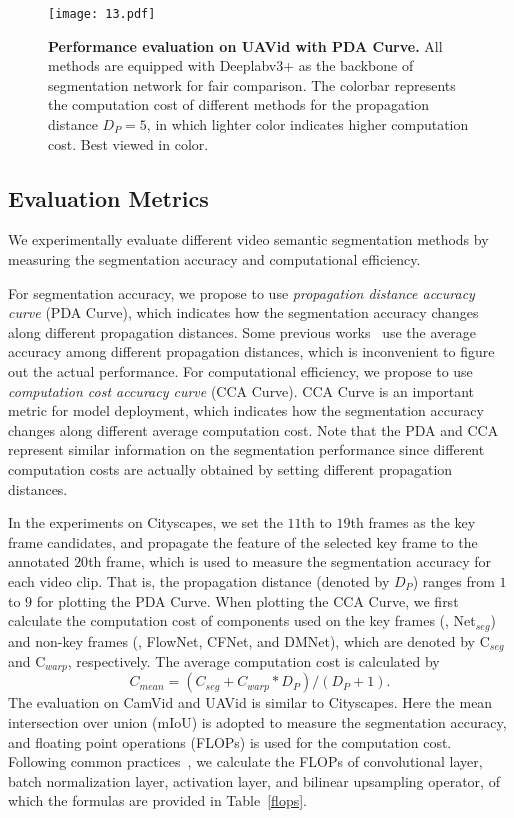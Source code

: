 \documentclass[journal]{IEEEtran}
\begin{document}
\begin{figure}[t]
	\begin{center}
		\texttt{[image: 13.pdf]}
	\end{center}
	\caption{\textbf{Performance evaluation on UAVid with PDA Curve.} All methods are equipped with Deeplabv3+ as the backbone of segmentation network for fair comparison. The colorbar represents the computation cost of different methods for the propagation distance $D_P=5$, in which lighter color indicates higher computation cost. Best viewed in color.}
	\label{exp_SCM_uavid}
\end{figure}

\subsection{Evaluation Metrics}
We experimentally evaluate different video semantic segmentation methods by measuring the segmentation accuracy and computational efficiency. 

For segmentation accuracy, we propose to use \emph{propagation distance \vs accuracy curve} (PDA Curve), which indicates how the segmentation accuracy changes along different propagation distances. Some previous works~\cite{zhu2017deep,jain2019accel} use the average accuracy among different propagation distances, which is inconvenient to figure out the actual performance. For computational efficiency, we propose to use \emph{computation cost \vs accuracy curve} (CCA Curve). CCA Curve is an important metric for model deployment, which indicates how the segmentation accuracy changes along different average computation cost.
Note that the PDA and CCA represent similar information on the segmentation performance since different computation costs are actually obtained by setting different propagation distances.

In the experiments on Cityscapes, we set the $11${th} to $19${th} frames as the key frame candidates, and propagate the feature of the selected key frame to the annotated $20${th} frame, which is used to measure the segmentation accuracy for each video clip. That is, the propagation distance (denoted by $D_{P}$) ranges from $1$ to $9$ for plotting the PDA Curve. When plotting the CCA Curve, we first calculate the computation cost of components used on the key frames (\ie, Net$_{seg}$) and non-key frames (\ie, FlowNet, CFNet, and DMNet), which are denoted by C$_{seg}$ and C$_{warp}$, respectively. The average computation cost is calculated by
\begin{equation}
C_{mean}=(C_{seg}+C_{warp}*D_{P})/(D_{P}+1). \label{eqn:cost}
\end{equation}
The evaluation on CamVid and UAVid is similar to Cityscapes. Here the mean intersection over union (mIoU) is adopted to measure the segmentation accuracy, and floating point operations (FLOPs) is used for the computation cost. Following common practices~\cite{molchanov2019pruning,howard2017mobilenets}, we calculate the FLOPs of convolutional layer, batch normalization layer, activation layer, and bilinear upsampling operator, of which the formulas are provided in Table~\ref{flops}. 
\end{document}
